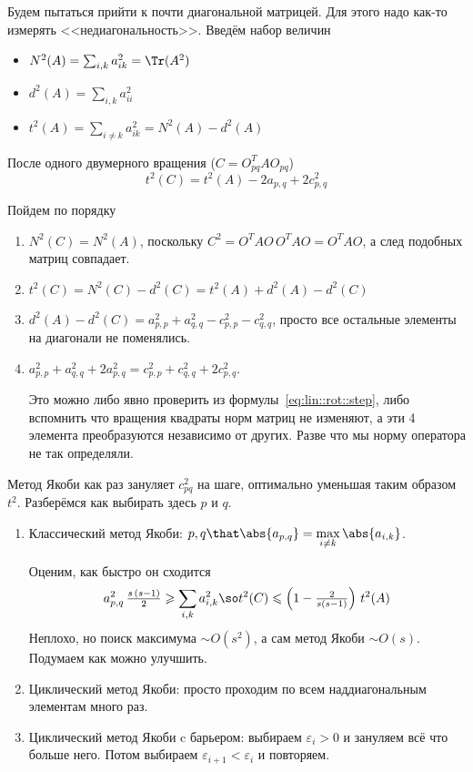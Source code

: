 \documentclass{trlnotes}
\begin{document}
Будем пытаться прийти к почти диагональной матрицей. Для этого надо
как-то измерять <<недиагональность>>.
Введём набор величин
\begin{itemize}
  \item $N^2(A) = \sum_{i,k} a_{ik}^{2} = \Tr (A^2)$
  \item $d^2(A) = \sum_{i,k} a_{ii}^{2}$
  \item $t^2(A) = \sum_{i\neq k} a_{ik}^{2} = N^2(A) - d^2(A)$
\end{itemize}

\begin{prop}\label{prop:lin::jacobi::nondiagest}
  После одного двумерного вращения ($C = O_{pq}^{T}AO_{pq}$)
  \[
    t^2(C) = t^2(A) - 2 a_{p,q} + 2 c_{p,q}^2
  \]
\end{prop}
\begin{prf}Пойдем по порядку
  \begin{enumerate}
    \item $N^2(C) = N^2(A)$, поскольку $C^2 = O^TAO\,O^TAO = O^{T}AO$, а след 
      подобных матриц совпадает.
    \item $t^2(C) = N^2(C) - d^2(C) = t^2(A) + d^2(A) - d^2(C)$
    \item $d^2(A) - d^2(C) = a_{p,p}^2 + a_{q,q}^2 - c_{p,p}^2 - c_{q,q}^2$, просто
      все остальные элементы на диагонали не поменялись.
    \item $a_{p,p}^2 + a_{q,q}^2 + 2a_{p,q}^2 = c_{p,p}^2 + c_{q,q}^2 + 2c_{p,q}^2$.

      Это можно либо явно проверить из формулы~\eqref{eq:lin::rot::step}, либо
      вспомнить что вращения квадраты норм матриц не изменяют, а эти 4 элемента
      преобразуются независимо от других. Разве что мы норму оператора не так 
      определяли.
  \end{enumerate}
\end{prf}
Метод Якоби как раз зануляет $c_{pq}^2$ на шаге, оптимально уменьшая таким образом
$t^2$.
Разберёмся как выбирать здесь $p$ и $q$. 

\begin{enumerate}
  \item Классический метод Якоби: 
    $p,q\that \abs{a_{p,q}} = \max\limits_{i\neq k}\abs{a_{i,k}}$.
    
    Оценим, как быстро он сходится
    \[
      a_{p,q}^2\, \tfrac{s\,(s-1)}2 \geqslant \sum_{i,k} a_{i,k}^2 \so
      t^2(C) \leqslant \left(1 - \tfrac{2}{s(s-1)}\right)\, t^2(A) 
    \]
    Неплохо, но поиск максимума $\sim O(s^2)$, а сам метод
    Якоби $\sim O(s)$. Подумаем как можно улучшить.
  \item Циклический метод Якоби: просто проходим по всем наддиагональным
    элементам много раз. 
  \item Циклический метод Якоби c барьером: выбираем $ε_i > 0$ и зануляем всё
    что больше него. Потом выбираем $ε_{i+1} < ε_{i}$ и повторяем.
\end{enumerate}
\end{document}
